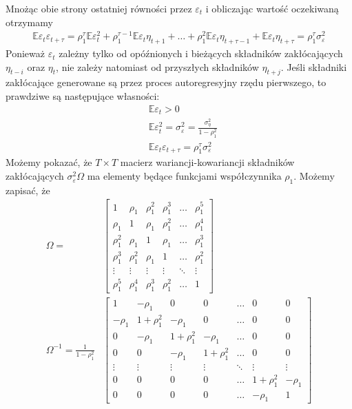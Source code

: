 Mnożąc obie strony ostatniej równości przez $ \varepsilon_t $ i obliczając wartość oczekiwaną otrzymamy
\begin{gather*}
\mathbb E \varepsilon_t\varepsilon_{t+\tau}=
\rho_1^\tau \mathbb E \varepsilon_t^2
+
\rho_1^{\tau -1}\mathbb E \varepsilon_t\eta_{t+1}
+\dots+
\rho_1^2\mathbb E \varepsilon_t\eta_{t+\tau-1}
+
\mathbb E \varepsilon_t\eta_{t+\tau}
=
\rho_1^\tau \sigma_\varepsilon^2
\end{gather*}
Ponieważ $ \varepsilon_t $ zależny tylko od opóźnionych i bieżących składników zakłócających $ \eta_{t-i} $ oraz $ \eta_t $, nie zależy natomiast od przyszłych składników $ \eta_{t+j} $. Jeśli składniki zakłócające generowane są przez proces autoregresyjny rzędu pierwszego, to prawdziwe są następujące własności:
\begin{align*}
&\mathbb E \varepsilon_t>0\\
&\mathbb E \varepsilon_t^2=\sigma_\varepsilon^2=\frac{\sigma_\eta^2}{1-\rho_1^2}\\
&\mathbb E\varepsilon_t\varepsilon_{t+\tau}=\rho_1^\tau\sigma_\varepsilon^2 
\end{align*}
Możemy pokazać, że $ T\times T $ macierz wariancji-kowariancji składników zakłócających $ \sigma_\varepsilon^2\Omega $ ma elementy będące funkcjami współczynnika $ \rho_1 $. Możemy zapisać, że
\begin{align*}
\Omega=
&\begin{bmatrix}
	1         & \rho _1   & \rho _1^2 & \rho _1^3 & \ldots & \rho _1^5 \\
	\rho _1   & 1         & \rho _1   & \rho _1^2 & \ldots & \rho _1^4 \\
	\rho _1^2 & \rho _1   & 1         & \rho _1   & \ldots & \rho _1^3 \\
	\rho _1^3 & \rho _1^2 & \rho _1   & 1         & \ldots & \rho _1^2 \\
	\vdots    & \vdots    & \vdots    & \vdots    & \ddots & \vdots    \\
	\rho _1^5 & \rho _1^4 & \rho _1^3 & \rho _1^2 & \ldots & 1
\end{bmatrix}
\\
\Omega^{-1}=
\frac{1}{1-\rho_1^2}
&\begin{bmatrix}
	1        & -\rho _1    & 0           & 0           & \ldots & 0           & 0        \\
	-\rho _1 & 1+\rho _1^2 & -\rho _1    & 0           & \ldots & 0           & 0        \\
	0        & -\rho _1    & 1+\rho _1^2 & -\rho _1    & \ldots & 0           & 0        \\
	0        & 0           & -\rho _1    & 1+\rho _1^2 & \ldots & 0           & 0        \\
	\vdots   & \vdots      & \vdots      & \vdots      & \ddots & \vdots      & \vdots   \\
	0        & 0           & 0           & 0           & \ldots & 1+\rho _1^2 & -\rho _1 \\
	0        & 0           & 0           & 0           & \ldots & -\rho _1    & 1
\end{bmatrix}
\end{align*}
